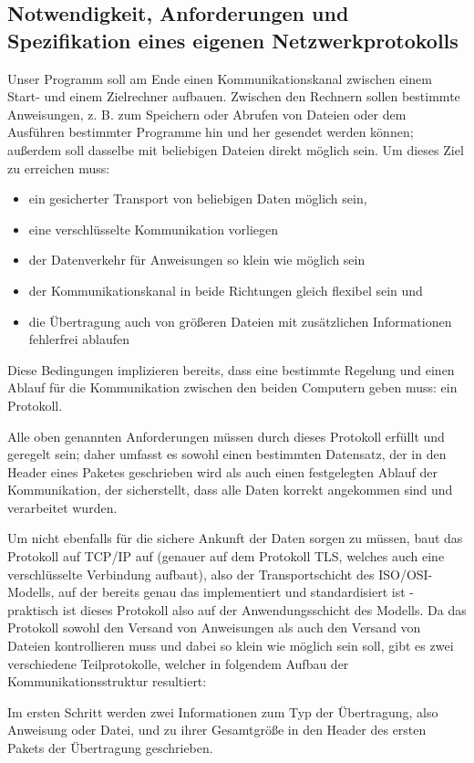 \subsection{Notwendigkeit, Anforderungen und Spezifikation eines eigenen Netzwerkprotokolls}
Unser Programm soll am Ende einen Kommunikationskanal zwischen einem Start- und einem Zielrechner aufbauen. 
Zwischen den Rechnern sollen bestimmte Anweisungen, z. B. zum Speichern oder Abrufen von Dateien oder dem Ausführen bestimmter Programme hin und her gesendet werden können; außerdem soll dasselbe mit beliebigen Dateien direkt möglich sein.
Um dieses Ziel zu erreichen muss:
\begin{itemize}
\item ein gesicherter Transport von beliebigen Daten möglich sein,
\item eine verschlüsselte Kommunikation vorliegen
\item der Datenverkehr für Anweisungen so klein wie möglich sein
\item der Kommunikationskanal in beide Richtungen gleich flexibel sein und
\item die Übertragung auch von größeren Dateien mit zusätzlichen Informationen fehlerfrei ablaufen
\end{itemize}
Diese Bedingungen implizieren bereits, dass eine bestimmte Regelung und einen Ablauf für die Kommunikation zwischen den beiden Computern geben muss: ein Protokoll.\par
Alle oben genannten Anforderungen müssen durch dieses Protokoll erfüllt und geregelt sein; daher umfasst es sowohl einen bestimmten Datensatz, der in den Header eines Paketes geschrieben wird als auch einen festgelegten Ablauf der Kommunikation, der sicherstellt, dass alle Daten korrekt angekommen sind und verarbeitet wurden.\par 
Um nicht ebenfalls für die sichere Ankunft der Daten sorgen zu müssen, baut das Protokoll auf TCP/IP auf (genauer auf dem Protokoll TLS, welches auch eine verschlüsselte Verbindung aufbaut), also der Transportschicht des ISO/OSI-Modells, auf der bereits genau das implementiert und standardisiert ist - praktisch ist dieses Protokoll also auf der Anwendungsschicht des Modells.
Da das Protokoll sowohl den Versand von Anweisungen als auch den Versand von Dateien kontrollieren muss und dabei so klein wie möglich sein soll, gibt es zwei verschiedene Teilprotokolle, welcher in folgendem Aufbau der Kommunikationsstruktur resultiert:\par
Im ersten Schritt werden zwei Informationen zum Typ der Übertragung, also Anweisung oder Datei, und zu ihrer Gesamtgröße in den Header des ersten Pakets der Übertragung geschrieben.
